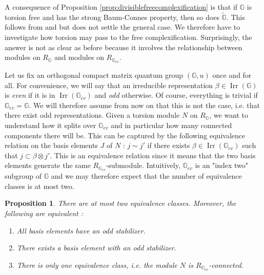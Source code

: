 \documentclass[a4paper, 11pt]{amsart}
\theoremstyle{plain}
\newtheorem{prop}[thm]{Proposition}
\theoremstyle{definition}
\theoremstyle{remark}
\DeclareMathOperator{\Irr}{Irr}
\newcommand{\G}{\mathbb{G}}
\begin{document}
A consequence of Proposition \ref{prop:divisiblefreecomplexification} is that if $\G$ is torsion free and has the strong Baum-Connes property, then so does $\widetilde{\G}$. This follows from \cite[Prop 1.28]{arano2015torsion} and \cite[Thm 6.6]{vergnioux2013k} but does not settle the general case. We therefore have to investigate how torsion may pass to the free complexification. Surprisingly, the answer is not as clear as before because it involves the relationship between modules on $R_{\G}$ and modules on $R_{\G_{ev}}$.

Let us fix an orthogonal compact matrix quantum group $(\G, u)$ once and for all. For convenience, we will say that an irreducible representation $\beta\in \Irr(\G)$ is \emph{even} if it is in $\Irr(\G_{ev})$ and \emph{odd} otherwise. Of course, everything is trivial if $\G_{ev} = \G$. We will therefore assume from now on that this is not the case, i.e. that there exist odd representations. Given a torsion module $N$ on $R_{\G}$, we want to understand how it splits over $\G_{ev}$ and in particular how many connected components there will be. This can be captured by the following equivalence relation on the basis elements $J$ of $N$ : $j\sim j'$ if there exists $\beta\in \Irr(\G_{ev})$ such that $j\subset \beta\otimes j'$. This is an equivalence relation since it means that the two basis elements generate the same $R_{\G_{ev}}$-submodule. Intuitively, $\G_{ev}$ is an "index two" subgroup of $\G$ and we may therefore expect that the number of equivalence classes is at most two.

\begin{prop}\label{prop:torsionevenpart}
There are at most two equivalence classes. Moreover, the following are equivalent :
\begin{enumerate}
\item All basis elements have an odd stabilizer.
\item There exists a basis element with an odd stabilizer.
\item There is only one equivalence class, i.e. the module $N$ is $R_{\G_{ev}}$-connected.
\end{enumerate}
\end{prop}
\end{document}
